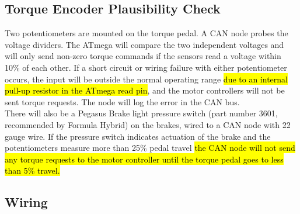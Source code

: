 \documentclass{article}
\DeclareRobustCommand{\hlr}[1]{{\sethlcolor{red}\hl{#1}}}
\begin{document}
    \subsection{Torque Encoder Plausibility Check}


        Two potentiometers are mounted on the torque pedal. A CAN node probes the voltage dividers. The ATmega will compare the two independent voltages and will only send non-zero torque commands if the sensors read a voltage within 10\% of each other. If a short circuit or wiring failure with either potentiometer occurs, the input will be outside the normal operating range \hlr{due to an internal pull-up resistor in the ATmega read pin}, and the motor controllers will not be sent torque requests. The node will log the error in the CAN bus.\\

        There will also be a Pegasus Brake light pressure switch (part number 3601, recommended by Formula Hybrid) on the brakes, wired to a CAN node with 22 gauge wire. If the pressure switch indicates actuation of the brake and the potentiometers measure more than 25\% pedal travel \hlr{the CAN node will not send any torque requests to the motor controller until the torque pedal goes to less than 5\% travel.}

    \subsection{Wiring}

\end{document}
